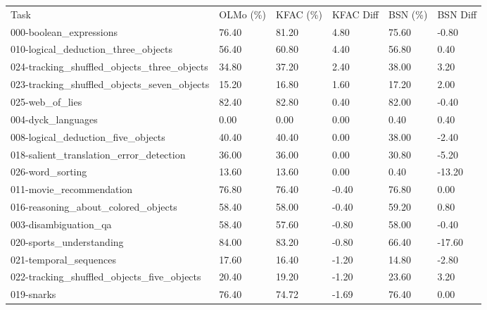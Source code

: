 \documentclass{article} %
\begin{document}
\begin{table}[]
\begin{tabular}{llllll}
Task                                            & OLMo (\%) & KFAC (\%) & KFAC Diff & BSN (\%) & BSN Diff \\
000-boolean\_expressions                        & 76.40    & 81.20    & 4.80      & 75.60   & -0.80    \\
010-logical\_deduction\_three\_objects          & 56.40    & 60.80    & 4.40      & 56.80   & 0.40     \\
024-tracking\_shuffled\_objects\_three\_objects & 34.80    & 37.20    & 2.40      & 38.00   & 3.20     \\
023-tracking\_shuffled\_objects\_seven\_objects & 15.20    & 16.80    & 1.60      & 17.20   & 2.00     \\
025-web\_of\_lies                               & 82.40    & 82.80    & 0.40      & 82.00   & -0.40    \\
004-dyck\_languages                             & 0.00     & 0.00     & 0.00      & 0.40    & 0.40     \\
008-logical\_deduction\_five\_objects           & 40.40    & 40.40    & 0.00      & 38.00   & -2.40    \\
018-salient\_translation\_error\_detection      & 36.00    & 36.00    & 0.00      & 30.80   & -5.20    \\
026-word\_sorting                               & 13.60    & 13.60    & 0.00      & 0.40    & -13.20   \\
011-movie\_recommendation                       & 76.80    & 76.40    & -0.40     & 76.80   & 0.00     \\
016-reasoning\_about\_colored\_objects          & 58.40    & 58.00    & -0.40     & 59.20   & 0.80     \\
003-disambiguation\_qa                          & 58.40    & 57.60    & -0.80     & 58.00   & -0.40    \\
020-sports\_understanding                       & 84.00    & 83.20    & -0.80     & 66.40   & -17.60   \\
021-temporal\_sequences                         & 17.60    & 16.40    & -1.20     & 14.80   & -2.80    \\
022-tracking\_shuffled\_objects\_five\_objects  & 20.40    & 19.20    & -1.20     & 23.60   & 3.20     \\
019-snarks                                      & 76.40    & 74.72    & -1.69     & 76.40   & 0.00     \\

\end{tabular}
\end{table}
\end{document}

